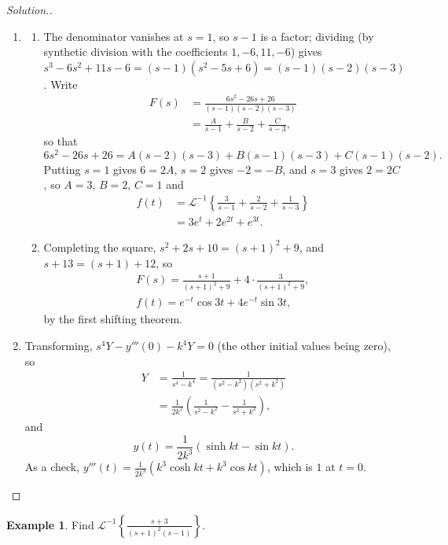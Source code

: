 \documentclass[11pt,a4paper]{article}
\theoremstyle{definition}
\newtheorem{exa}[thm]{Example}
\newenvironment{solution}
  {\renewcommand{\qedsymbol}{}\begin{proof}[\textit{Solution}.]}
  {\end{proof}}
\begin{document}
\begin{solution}
\begin{enumerate}
\item
\begin{enumerate}
\item The denominator vanishes at $s = 1$, so $s - 1$ is a factor; dividing (by
synthetic division with the coefficients $1, -6, 11, -6$) gives
$s^3 -6s^2 + 11s - 6 = (s-1)(s^2 -5s + 6) =(s-1)(s-2)(s-3)$. Write
\begin{align*}
F(s) &= \frac{6s^2 -26s + 26}{(s-1)(s-2)(s-3)}\\
&= \frac{A}{s -1} + \frac{B}{s-2} + \frac{C}{s -3},
\end{align*}
so that
\[6s^2 -26s + 26 = A(s-2)(s-3) + B(s-1)(s-3) + C(s-1)(s-2) .\]
Putting $s = 1$
gives $6 = 2A$, $s = 2$ gives $-2 = -B$, and $s = 3$ gives $2 = 2C$, so
$A = 3$, $B = 2$, $C = 1$ and
\begin{align*}
f(t) &= \mathcal{L}^{-1}\left\{ \frac{3}{s -1} + \frac{2}{s-2} +
\frac{1}{s-3}\right\}\\
&= 3e^t + 2 e^{2t} + e^{3t} .
\end{align*}

\item Completing the square,
$s^2 + 2s + 10 = (s+1)^2 + 9$, and $s + 13 = (s + 1) + 12$, so
\begin{gather*}
F(s) = \frac{s + 1}{(s+1)^2 + 9} + 4\cdot\frac{3}{(s+1)^2 + 9},\\
f(t) = e^{-t} \cos 3t + 4e^{-t} \sin 3t ,
\end{gather*}
by the first shifting theorem.
\end{enumerate}

\item Transforming, $s^4Y - y'''(0) - k^4Y = 0$ (the other initial values being
zero), so
\begin{align*}
Y &= \frac{1}{s^4 - k^4} = \frac{1}{(s^2 - k^2)(s^2 + k^2)}\\
&= \frac{1}{2k^2}\left(\frac{1}{s^2 - k^2} - \frac{1}{s^2 + k^2}\right),
\end{align*}
and
\[y(t) = \frac{1}{2k^3}\left(\sinh kt - \sin kt\right) .\]
As a check, $y'''(t) = \frac{1}{2k^3}\left(k^3\cosh kt + k^3\cos kt\right)$, which
is $1$ at $t = 0$.
\end{enumerate}
\end{solution}

\begin{exa}
\label{ex:repeatedfactor}
Find $\mathcal{L}^{-1}\left\{\frac{s + 3}{(s + 1)^2(s - 1)}\right\}$.
\end{exa}
\end{document}
